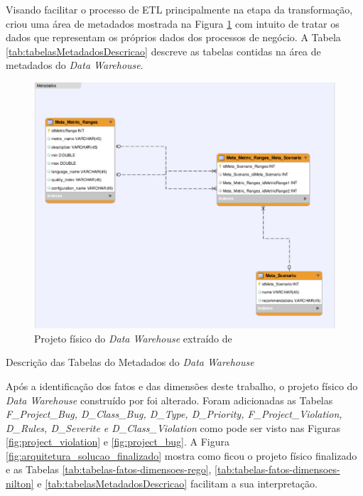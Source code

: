 Visando facilitar o processo de ETL principalmente na etapa da transformação,  criou uma área de metadados mostrada na Figura \ref{fig:metadados} com intuito de tratar os dados que representam os próprios dados dos processos de negócio. A Tabela \ref{tab:tabelasMetadadosDescricao} descreve as tabelas contidas na área de metadados do \textit{Data Warehouse}.

\begin{figure}[h!]
\centering
\includegraphics[keepaspectratio=false,scale=0.6]{figuras/figuras_nilton/metadados-baufaker.eps}
\caption{Projeto físico do \textit{Data Warehouse} extraído de }
\label{fig:metadados}
\end{figure}
\FloatBarrier

\begin{table}[!ht]
	\begin{center}
	
	 
	\caption{Descrição das Tabelas do Metadados do \textit{Data Warehouse} }
	\label{tab:tabelasMetadadosDescricao}
	\end{center}
	\end{table}	
	\FloatBarrier
	

Após a identificação dos fatos e das dimensões deste trabalho, o projeto físico do \textit{Data Warehouse} construído por  foi alterado. Foram adicionadas as Tabelas \textit{F\_Project\_Bug, D\_Class\_Bug, D\_Type, D\_Priority, F\_Project\_Violation, D\_Rules, D\_Severite e D\_Class\_Violation} como pode ser visto nas Figuras \ref{fig:project_violation} e \ref{fig:project_bug}. A Figura \ref{fig:arquitetura_solucao_finalizado} mostra como ficou o projeto físico finalizado e as Tabelas \ref{tab:tabelas-fatos-dimensoes-rego}, \ref{tab:tabelas-fatos-dimensoes-nilton} e \ref{tab:tabelasMetadadosDescricao} facilitam a sua interpretação.	

